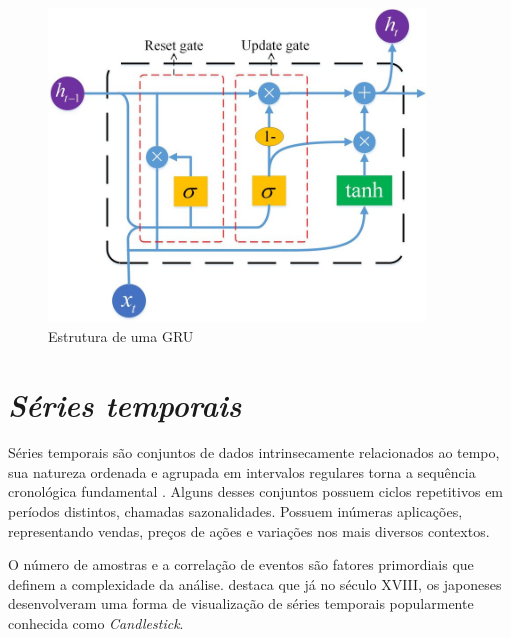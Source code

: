 \begin{figure}[!htb] \centering
  \caption{Estrutura de uma GRU} \label{figura:gru}
  \begin{varwidth}{\linewidth}
    \includegraphics[width=10cm]{figuras/gru.png}
  \end{varwidth}
\end{figure}

\section{\textit{Séries temporais}} \label{sec:temp}
Séries temporais são conjuntos de dados intrinsecamente relacionados ao tempo, sua natureza ordenada e agrupada em intervalos regulares
torna a sequência cronológica fundamental \cite{Esling}. Alguns desses conjuntos possuem ciclos repetitivos em períodos distintos, chamadas sazonalidades. 
Possuem inúmeras aplicações, representando vendas, preços de ações e variações nos mais diversos contextos.

O número de amostras e a correlação de eventos são fatores primordiais que definem a complexidade da análise.
\textcite{Nison} destaca que já no século XVIII, os japoneses desenvolveram uma forma de
visualização de séries temporais popularmente conhecida como \textit{Candlestick}.



